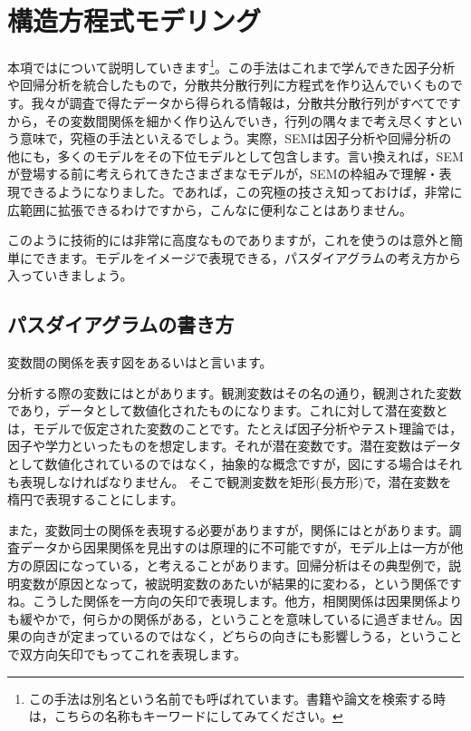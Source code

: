 \documentclass{ltjsbook}
\begin{document}
\chapter{構造方程式モデリング}
\label{x12_SEM}

本項ではについて説明していきます\footnote{この手法は別名という名前でも呼ばれています。書籍や論文を検索する時は，こちらの名称もキーワードにしてみてください。}。この手法はこれまで学んできた因子分析や回帰分析を統合したもので，分散共分散行列に方程式を作り込んでいくものです。我々が調査で得たデータから得られる情報は，分散共分散行列がすべてですから，その変数間関係を細かく作り込んでいき，行列の隅々まで考え尽くすという意味で，究極の手法といえるでしょう。実際，SEMは因子分析や回帰分析の他にも，多くのモデルをその下位モデルとして包含します。言い換えれば，SEMが登場する前に考えられてきたさまざまなモデルが，SEMの枠組みで理解・表現できるようになりました。であれば，この究極の技さえ知っておけば，非常に広範囲に拡張できるわけですから，こんなに便利なことはありません。

このように技術的には非常に高度なものでありますが，これを使うのは意外と簡単にできます。モデルをイメージで表現できる，パスダイアグラムの考え方から入っていきましょう。

\section{パスダイアグラムの書き方}
変数間の関係を表す図をあるいはと言います。

分析する際の変数にはとがあります。観測変数はその名の通り，観測された変数であり，データとして数値化されたものになります。これに対して潜在変数とは，モデルで仮定された変数のことです。たとえば因子分析やテスト理論では，因子や学力といったものを想定します。それが潜在変数です。潜在変数はデータとして数値化されているのではなく，抽象的な概念ですが，図にする場合はそれも表現しなければなりません。
そこで観測変数を矩形(長方形)で，潜在変数を楕円で表現することにします。

また，変数同士の関係を表現する必要がありますが，関係にはとがあります。調査データから因果関係を見出すのは原理的に不可能ですが，モデル上は一方が他方の原因になっている，と考えることがあります。回帰分析はその典型例で，説明変数が原因となって，被説明変数のあたいが結果的に変わる，という関係ですね。こうした関係を一方向の矢印で表現します。他方，相関関係は因果関係よりも緩やかで，何らかの関係がある，ということを意味しているに過ぎません。因果の向きが定まっているのではなく，どちらの向きにも影響しうる，ということで双方向矢印でもってこれを表現します。
\end{document}
